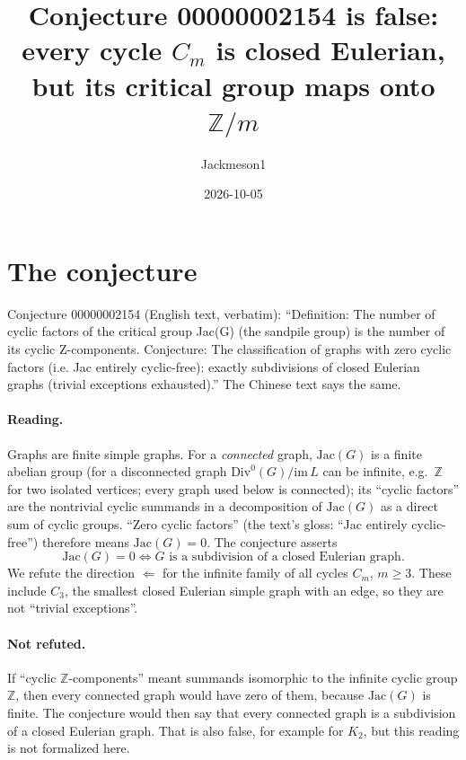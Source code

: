 \documentclass[11pt]{article}
\title{Conjecture 00000002154 is false:\\ every cycle $C_m$ is closed Eulerian, but its critical group maps onto $\mathbb Z/m$}
\author{Jackmeson1}
\date{2026-10-05}
\theoremstyle{definition}
\begin{document}
\maketitle

\section{The conjecture}
Conjecture 00000002154 (English text, verbatim): ``Definition: The number of cyclic factors of the
critical group Jac(G) (the sandpile group) is the number of its cyclic Z-components. Conjecture:
The classification of graphs with zero cyclic factors (i.e. Jac entirely cyclic-free): exactly
subdivisions of closed Eulerian graphs (trivial exceptions exhausted).'' The Chinese text says the
same.

\paragraph{Reading.} Graphs are finite simple graphs. For a \emph{connected} graph, $\mathrm{Jac}(G)$ is a finite abelian group (for a disconnected graph $\mathrm{Div}^0(G)/\mathrm{im}\,L$ can be infinite, e.g.\ $\mathbb Z$ for two isolated vertices; every graph used below is connected);
its ``cyclic factors'' are the nontrivial cyclic summands in a decomposition of $\mathrm{Jac}(G)$
as a direct sum of cyclic groups. ``Zero cyclic factors'' (the text's gloss: ``Jac entirely
cyclic-free'') therefore means $\mathrm{Jac}(G)=0$. The conjecture asserts
\[ \mathrm{Jac}(G)=0 \iff G \text{ is a subdivision of a closed Eulerian graph}. \]
We refute the direction $\Leftarrow$ for the infinite family of all cycles $C_m$, $m\ge 3$. These
include $C_3$, the smallest closed Eulerian simple graph with an edge, so they are not ``trivial
exceptions''.

\paragraph{Not refuted.} If ``cyclic $\mathbb Z$-components'' meant summands isomorphic to the
infinite cyclic group $\mathbb Z$, then every connected graph would have zero of them, because
$\mathrm{Jac}(G)$ is finite. The conjecture would then say that every connected graph is a
subdivision of a closed Eulerian graph. That is also false, for example for $K_2$, but this
reading is not formalized here.
\end{document}
